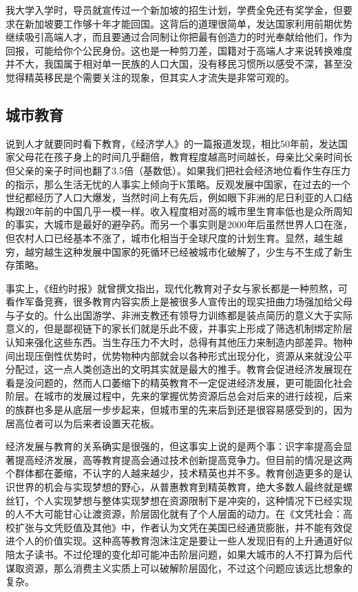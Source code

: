 \documentclass[
]{book}
\begin{document}
我大学入学时，导员就宣传过一个新加坡的招生计划，学费全免还有奖学金，但要求在新加坡要工作够十年才能回国。这背后的道理很简单，发达国家利用前期优势继续吸引高端人才，而且要通过合同制让你把最有创造力的时光奉献给他们，作为回报，可能给你个公民身份。这也是一种剪刀差，国籍对于高端人才来说转换难度并不大，我国属于相对单一民族的人口大国，没有移民习惯所以感受不深，甚至没觉得精英移民是个需要关注的现象，但其实人才流失是非常可观的。

\hypertarget{ux57ceux5e02ux6559ux80b2}{%
\subsection{城市教育}\label{ux57ceux5e02ux6559ux80b2}}

说到人才就要同时看下教育，《经济学人》的一篇报道发现，相比50年前，发达国家父母花在孩子身上的时间几乎翻倍，教育程度越高时间越长，母亲比父亲时间长但父亲的亲子时间也翻了3.5倍（基数低）。如果我们把社会经济地位看作生存压力的指示，那么生活无忧的人事实上倾向于K策略。反观发展中国家，在过去的一个世纪都经历了人口大爆发，当然时间上有先后，例如眼下非洲的尼日利亚的人口结构跟20年前的中国几乎一模一样。收入程度相对高的城市里生育率低也是众所周知的事实，大城市是最好的避孕药。而另一个事实则是2000年后虽然世界人口在涨，但农村人口已经基本不涨了，城市化相当于全球尺度的计划生育。显然，越生越穷，越穷越生这种发展中国家的死循环已经被城市化破解了，少生与不生成了新生存策略。

事实上，《纽约时报》就曾撰文指出，现代化教育对子女与家长都是一种煎熬，可看作军备竞赛，很多教育内容实质上是被很多人宣传出的现实扭曲力场强加给父母与子女的。什么出国游学、非洲支教还有领导力训练都是装点简历的意义大于实际意义的，但是鄙视链下的家长们就是乐此不疲，并事实上形成了筛选机制绑定阶层认知来强化这些东西。当生存压力不大时，总得有其他压力来制造内部差异。物种间出现压倒性优势时，优势物种内部就会以各种形式出现分化，资源从来就没公平分配过，这一点人类创造出的文明其实就是最大的推手。教育会促进经济发展现在看是没问题的，然而人口萎缩下的精英教育不一定促进经济发展，更可能固化社会阶层。在城市的发展过程中，先来的掌握优势资源后总会对后来的进行歧视，后来的族群也多是从底层一步步起来，但城市里的先来后到还是很容易感受到的，因为居高位者可以为后来者设置天花板。

经济发展与教育的关系确实是很强的，但这事实上说的是两个事：识字率提高会显著提高经济发展，高等教育提高会通过技术创新提高竞争力。但目前的情况是这两个群体都在萎缩，不认字的人越来越少，技术精英也并不多。教育创造更多的是认识世界的机会与实现梦想的野心，从普惠教育到精英教育，绝大多数人最终就是螺丝钉，个人实现梦想与整体实现梦想在资源限制下是冲突的，这种情况下已经实现的人不大可能甘心让渡资源，阶层固化就有了个人层面的动力。在《文凭社会：高校扩张与文凭贬值及其他》中，作者认为文凭在美国已经通货膨胀，并不能有效促进个人的价值实现。这种高等教育泡沫注定是要让一些人发现旧有的上升通道好似陪太子读书。不过伦理的变化却可能冲击阶层问题，如果大城市的人不打算为后代谋取资源，那么消费主义实质上可以破解阶层固化，不过这个问题应该远比想象的复杂。
\end{document}
